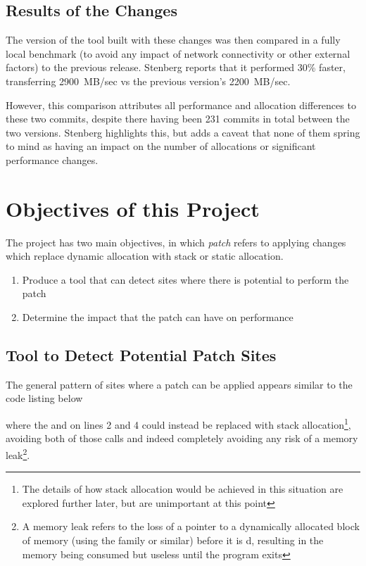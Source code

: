 \subsection{Results of the Changes}

The version of the tool built with these changes was then compared in a fully local benchmark (to avoid any impact of network connectivity or other external factors) to the previous release. Stenberg reports that it performed 30\% faster, transferring 2900~MB/sec vs the previous version's 2200~MB/sec.

However, this comparison attributes all performance and allocation differences to these two commits, despite there having been 231 commits in total between the two versions. Stenberg highlights this, but adds a caveat that none of them spring to mind as having an impact on the number of allocations or significant performance changes.

\section{Objectives of this Project}

The project has two main objectives, in which \textit{patch} refers to applying changes which replace dynamic allocation with stack or static allocation.

\begin{enumerate}
	\itemsep-0.25em
	\item Produce a tool that can detect sites where there is potential to perform the patch
	\item Determine the impact that the patch can have on performance
\end{enumerate}

\subsection{Tool to Detect Potential Patch Sites}

The general pattern of sites where a patch can be applied appears similar to the code listing below



where the \malloc{} and \free{} on lines 2 and 4 could instead be replaced with stack allocation\footnote{The details of how stack allocation would be achieved in this situation are explored further later, but are unimportant at this point}, avoiding both of those calls and indeed completely avoiding any risk of a memory leak\footnote{A memory leak refers to the loss of a pointer to a dynamically allocated block of memory (using the \malloc{} family or similar) before it is \free{}d, resulting in the memory being consumed but useless until the program exits}.


